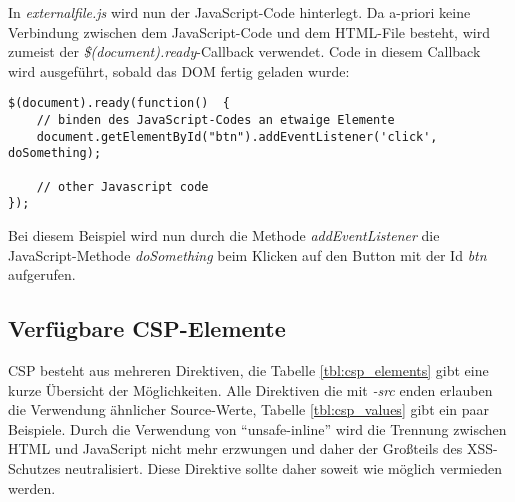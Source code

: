 In \textit{externalfile.js} wird nun der JavaScript-Code hinterlegt. Da a-priori keine Verbindung zwischen dem JavaScript-Code und dem HTML-File besteht, wird zumeist der \textit{\$(document).ready}-Callback verwendet. Code in diesem Callback wird ausgeführt, sobald das DOM fertig geladen wurde:

\begin{verbatim}
$(document).ready(function()  {
	// binden des JavaScript-Codes an etwaige Elemente
	document.getElementById("btn").addEventListener('click', doSomething);

	// other Javascript code
});
\end{verbatim}

Bei diesem Beispiel wird nun durch die Methode \textit{addEventListener} die JavaScript-Methode \textit{doSomething} beim Klicken auf den Button mit der Id \textit{btn} aufgerufen.

\subsection{Verfügbare CSP-Elemente}

CSP besteht aus mehreren Direktiven, die Tabelle \ref{tbl:csp_elements} gibt eine kurze Übersicht der Möglichkeiten. Alle Direktiven die mit \textit{-src} enden erlauben die Verwendung ähnlicher Source-Werte, Tabelle \ref{tbl:csp_values} gibt ein paar Beispiele. Durch die Verwendung von ``unsafe-inline'' wird die Trennung zwischen HTML und JavaScript nicht mehr erzwungen und daher der Großteils des XSS-Schutzes neutralisiert. Diese Direktive sollte daher soweit wie möglich vermieden werden.


